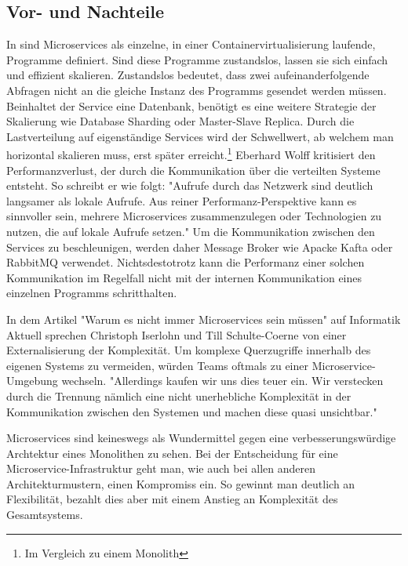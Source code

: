 \subsection{Vor- und Nachteile}
\label{subsec:vorundnachteile}
In  sind Microservices
als einzelne, in einer Containervirtualisierung laufende, Programme definiert. Sind diese Programme
zustandslos, lassen sie sich einfach und effizient skalieren. Zustandslos bedeutet, dass zwei
aufeinanderfolgende Abfragen nicht an die gleiche Instanz des Programms gesendet werden müssen.
Beinhaltet der Service eine Datenbank, benötigt es eine weitere Strategie der Skalierung
wie Database Sharding oder Master-Slave Replica. Durch die Lastverteilung auf eigenständige Services
wird der Schwellwert, ab welchem man horizontal skalieren muss, erst später erreicht.\footnote{Im Vergleich zu einem Monolith}
Eberhard Wolff kritisiert den Performanzverlust, der durch die
Kommunikation über die verteilten Systeme entsteht. So schreibt er wie folgt: "Aufrufe durch das Netzwerk
sind deutlich langsamer als lokale Aufrufe. Aus reiner Performanz-Perspektive kann es sinnvoller sein,
mehrere Microservices zusammenzulegen oder Technologien zu nutzen, die auf lokale Aufrufe setzen."\cite[S. 65, 3. Absatz]{MicroservicesBook}
Um die Kommunikation zwischen den Services zu beschleunigen, werden daher Message Broker wie
Apacke Kafta oder RabbitMQ verwendet. Nichtsdestotrotz kann die Performanz einer solchen
Kommunikation im Regelfall nicht mit der internen Kommunikation eines einzelnen Programms schritthalten.

In dem Artikel "Warum es nicht immer Microservices sein müssen" auf Informatik Aktuell
sprechen Christoph Iserlohn und Till Schulte-Coerne von einer Externalisierung der Komplexität.
Um komplexe Querzugriffe innerhalb des eigenen Systems zu vermeiden, würden Teams oftmals 
zu einer Microservice-Umgebung wechseln. "Allerdings kaufen wir uns dies teuer ein.
Wir verstecken durch die Trennung nämlich eine nicht unerhebliche Komplexität in
der Kommunikation zwischen den Systemen und machen diese quasi unsichtbar."\cite[Paragraph 11]{InformatikAktuellWarumNichtImmerMicroservices}

Microservices sind keineswegs als Wundermittel gegen eine verbesserungswürdige Archtektur eines
Monolithen zu sehen. Bei der Entscheidung für eine Microservice-Infrastruktur geht man, wie
auch bei allen anderen Architekturmustern, einen Kompromiss ein. So gewinnt man deutlich
an Flexibilität, bezahlt dies aber mit einem Anstieg an Komplexität des Gesamtsystems.

